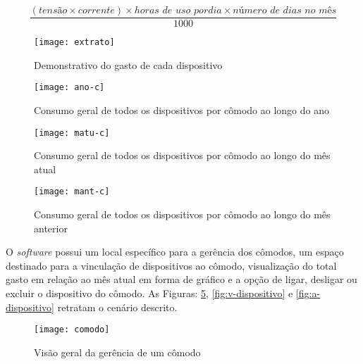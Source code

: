 \begin{equation} \label{eq-potencia}
	 \frac{ (tensão \times corrente) \times horas \, \, de \, \, uso \, \, por dia \times número \, \, de \, \, dias \, \, no \, \, mês}{1000}
\end{equation} 

\begin{figure}[h!]
	\texttt{[image: extrato]}
	\centering
	\caption[Demonstrativo do gasto de cada dispositivo]{Demonstrativo do gasto de cada dispositivo}
	\label{fig:extrato} 
\end{figure}
\FloatBarrier

\begin{figure}[h!]
	\texttt{[image: ano-c]}
	\centering
	\caption[Consumo geral de todos os dispositivos por cômodo ao longo do ano]{Consumo geral de todos os dispositivos por cômodo ao longo do ano}
	\label{fig:ano-c} 
\end{figure}
\FloatBarrier

\begin{figure}[h!]
	\texttt{[image: matu-c]}
	\centering
	\caption[Consumo geral de todos os dispositivos por cômodo ao longo do mês atual]{Consumo geral de todos os dispositivos por cômodo ao longo do mês atual}
	\label{fig:matu-c} 
\end{figure}
\FloatBarrier

\begin{figure}[h!]
	\texttt{[image: mant-c]}
	\centering
	\caption[Consumo geral de todos os dispositivos por cômodo ao longo do mês anterior]{Consumo geral de todos os dispositivos por cômodo ao longo do mês anterior}
	\label{fig:mant-c} 
\end{figure}
\FloatBarrier

O \textit{software} possui um local específico para a gerência dos cômodos, um espaço destinado para a vinculação de dispositivos ao cômodo,
visualização do total gasto em relação ao mês atual em forma de gráfico e a opção de ligar, desligar ou excluir o dispositivo do cômodo. As Figuras:
\ref{fig:comodo-ft}, \ref{fig:v-dispositivo} e \ref{fig:a-dispositivo} retratam o cenário descrito.

\begin{figure}[h!]
	\texttt{[image: comodo]}
	\centering
	\caption[Visão geral da gerência de um cômodo]{Visão geral da gerência de um cômodo}
	\label{fig:comodo-ft} 
\end{figure}
\FloatBarrier

